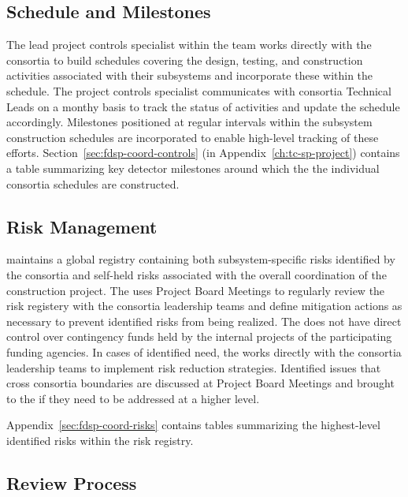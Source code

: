 \subsection{Schedule and Milestones}

The lead project controls specialist within the  team works
directly with the  consortia to build schedules covering
the design, testing, and construction activities associated with their
subsystems and incorporate these within the 
schedule.  The project controls specialist communicates with consortia
Technical Leads on a monthy basis to track the status of activities
and update the  schedule accordingly.  Milestones
positioned at regular intervals within the subsystem construction
schedules are incorporated to enable high-level tracking of these
efforts.  Section~\ref{sec:fdsp-coord-controls} (in
Appendix~\ref{ch:tc-sp-project}) contains a table summarizing key
detector milestones around which the the individual consortia
schedules are constructed.

\subsection{Risk Management}

  maintains a global registry containing both
subsystem-specific risks identified by the consortia and self-held
risks associated with the overall coordination of the  
construction project.  The  uses Project Board Meetings 
to regularly review the risk registery with the consortia leadership 
teams and define mitigation actions as necessary to prevent identified 
risks from being realized.  The  does not have direct 
control over contingency funds held by the internal projects of 
the participating funding agencies.  In cases of identified need, 
the  works directly with the consortia leadership teams 
to implement risk reduction strategies.  Identified issues that cross 
consortia boundaries are discussed at Project Board Meetings and 
brought to the   if they need to be addressed 
at a higher level.

Appendix~\ref{sec:fdsp-coord-risks} contains tables summarizing the 
highest-level identified risks within the  risk registry.

\subsection{Review Process}

